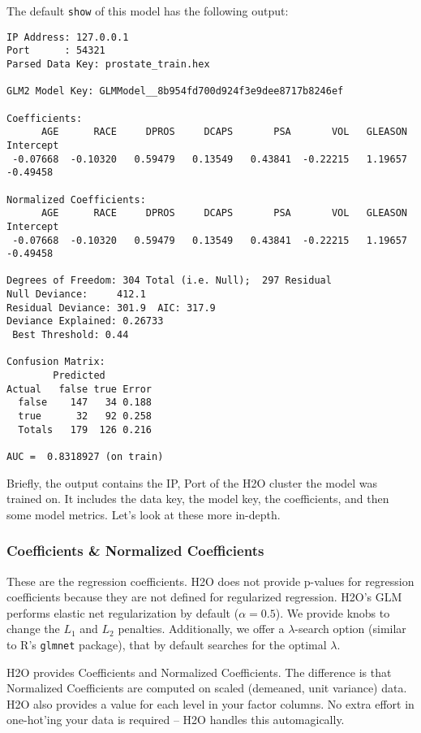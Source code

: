 \documentclass[11pt]{article}
\begin{document}
The default \texttt{show} of this model has the following output:

\begin{verbatim}
IP Address: 127.0.0.1 
Port      : 54321 
Parsed Data Key: prostate_train.hex 

GLM2 Model Key: GLMModel__8b954fd700d924f3e9dee8717b8246ef

Coefficients:
      AGE      RACE     DPROS     DCAPS       PSA       VOL   GLEASON Intercept 
 -0.07668  -0.10320   0.59479   0.13549   0.43841  -0.22215   1.19657  -0.49458 

Normalized Coefficients:
      AGE      RACE     DPROS     DCAPS       PSA       VOL   GLEASON Intercept 
 -0.07668  -0.10320   0.59479   0.13549   0.43841  -0.22215   1.19657  -0.49458 

Degrees of Freedom: 304 Total (i.e. Null);  297 Residual
Null Deviance:     412.1
Residual Deviance: 301.9  AIC: 317.9
Deviance Explained: 0.26733 
 Best Threshold: 0.44

Confusion Matrix:
        Predicted
Actual   false true Error
  false    147   34 0.188
  true      32   92 0.258
  Totals   179  126 0.216

AUC =  0.8318927 (on train) 
\end{verbatim}

Briefly, the output contains the IP, Port of the H2O cluster the model was trained on. It includes the data key, the model key, the coefficients, and then some model metrics. Let's look at these more in-depth.

\subsubsection{Coefficients \& Normalized Coefficients}
These are the regression coefficients. H2O does not provide p-values for regression coefficients because they are not defined for regularized regression. H2O's GLM performs elastic net regularization by default ($\alpha = 0.5$). We provide knobs to change the $L_1$ and $L_2$ penalties. Additionally, we offer a $\lambda$-search option (similar to R's \texttt{glmnet} package), that by default searches for the optimal $\lambda$.

H2O provides Coefficients and Normalized Coefficients. The difference is that Normalized Coefficients are computed on scaled (demeaned, unit variance) data. H2O also provides a value for each level in your factor columns. No extra effort in one-hot'ing your data is required -- H2O handles this automagically.
\end{document}
